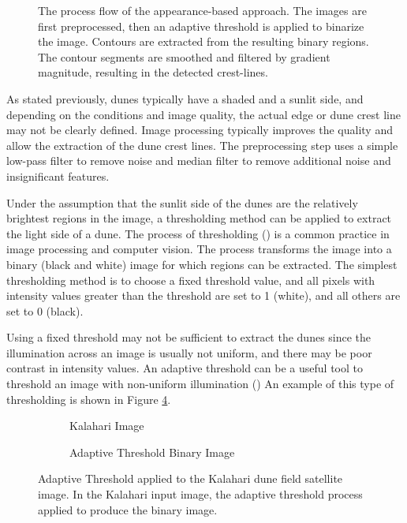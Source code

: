  \begin{figure}[H]
 	\centering
 	\caption{The process flow of the appearance-based approach. The images are first preprocessed, then an adaptive threshold is applied to binarize the image. Contours are extracted from the resulting binary regions. The contour segments are smoothed and filtered by gradient magnitude, resulting in the detected crest-lines.}
 	\label{fig:flow_appearance_based}
 \end{figure}

As stated previously, dunes typically have a shaded and a sunlit side, and depending on the conditions and image quality, the actual edge or dune crest line may not be clearly defined. Image processing typically improves the quality and allow the extraction of the dune crest lines. The preprocessing step uses a simple low-pass filter to remove noise and median filter to remove additional noise and insignificant features.

Under the assumption that the sunlit side of the dunes are the relatively brightest regions in the image, a thresholding method can be applied to extract the light side of a dune. The process of thresholding (\cite{digital_image_processing_book}) is a common practice in image processing and computer vision. The process transforms the image into a binary (black and white) image for which regions can be extracted. The simplest thresholding method is to choose a fixed threshold value, and all pixels with intensity values greater than the threshold are set to 1 (white), and all others are set to 0 (black).

Using a fixed threshold may not be sufficient to extract the dunes since the illumination across an image is usually not uniform, and there may be poor contrast in intensity values. An adaptive threshold can be a useful tool to threshold an image with non-uniform illumination (\cite{1990_comparative_performance_study_thresholding,1979_threshold_selection_method_gray_level_histogram,2004_survey_over_image_thresholding_techniques}) An example of this type of thresholding is shown in Figure \ref{fig:adaptive_threshold}. 

\begin{figure}
	\centering
	\begin{subfigure}{0.48\textwidth}
		\centering
		\caption{Kalahari Image}
		\label{fig:kalahari_adaptive_threshold_input}
	\end{subfigure}
	\begin{subfigure}{0.48\textwidth}
		\centering
		\caption{Adaptive Threshold Binary Image}
		\label{fig:kalahari_adaptive_threshold}
	\end{subfigure}
	\caption{Adaptive Threshold applied to the Kalahari dune field satellite image. In  the Kalahari input image,  the adaptive threshold process applied to produce the binary image. }
	\label{fig:adaptive_threshold}
\end{figure}

